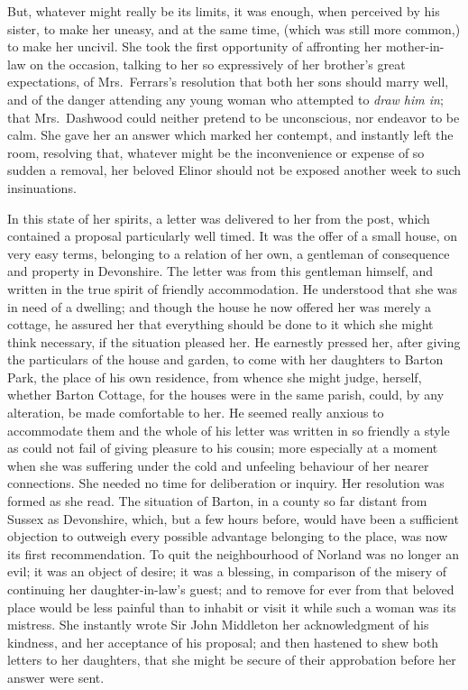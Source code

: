But, whatever might really be its limits, it was enough,
when perceived by his sister, to make her uneasy,
and at the same time, (which was still more common,)
to make her uncivil.  She took the first opportunity of
affronting her mother-in-law on the occasion, talking to
her so expressively of her brother's great expectations,
of Mrs.\ Ferrars's resolution that both her sons should
marry well, and of the danger attending any young woman
who attempted to \emph{draw him in}; that Mrs.\ Dashwood could
neither pretend to be unconscious, nor endeavor to be calm.
She gave her an answer which marked her contempt,
and instantly left the room, resolving that, whatever might
be the inconvenience or expense of so sudden a removal,
her beloved Elinor should not be exposed another week
to such insinuations.

In this state of her spirits, a letter was delivered
to her from the post, which contained a proposal
particularly well timed.  It was the offer of a small house,
on very easy terms, belonging to a relation of her own,
a gentleman of consequence and property in Devonshire.
The letter was from this gentleman himself, and written
in the true spirit of friendly accommodation.
He understood that she was in need of a dwelling;
and though the house he now offered her was merely a cottage,
he assured her that everything should be done to it which
she might think necessary, if the situation pleased her.
He earnestly pressed her, after giving the particulars
of the house and garden, to come with her daughters to
Barton Park, the place of his own residence, from whence
she might judge, herself, whether Barton Cottage, for the
houses were in the same parish, could, by any alteration,
be made comfortable to her.  He seemed really anxious to
accommodate them and the whole of his letter was written
in so friendly a style as could not fail of giving pleasure
to his cousin; more especially at a moment when she was
suffering under the cold and unfeeling behaviour of her
nearer connections.  She needed no time for deliberation
or inquiry.  Her resolution was formed as she read.
The situation of Barton, in a county so far distant from
Sussex as Devonshire, which, but a few hours before,
would have been a sufficient objection to outweigh every
possible advantage belonging to the place, was now its
first recommendation.  To quit the neighbourhood of Norland
was no longer an evil; it was an object of desire;
it was a blessing, in comparison of the misery of continuing
her daughter-in-law's guest; and to remove for ever
from that beloved place would be less painful than to
inhabit or visit it while such a woman was its mistress.
She instantly wrote Sir John Middleton her acknowledgment
of his kindness, and her acceptance of his proposal;
and then hastened to shew both letters to her daughters,
that she might be secure of their approbation before her
answer were sent.

